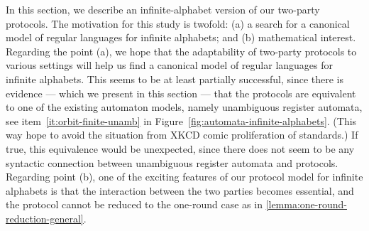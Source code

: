 In this section, we describe an infinite-alphabet version of our two-party protocols.
The motivation for this study is twofold: (a) a search for a canonical model of regular languages for infinite alphabets; and (b) mathematical interest. Regarding the point (a), we hope that the adaptability of two-party protocols to various settings will help us  find a canonical model of regular languages for infinite alphabets. This seems to be at least partially successful, since there is evidence --- which we present in this section --- that the protocols are equivalent to one of the existing automaton models, namely unambiguous register automata, see item~\ref{it:orbit-finite-unamb} in Figure~\ref{fig:automata-infinite-alphabets}. (This way hope to avoid the situation from XKCD comic proliferation of standards.) If true, this equivalence would be unexpected, since there does not seem to be any syntactic connection between unambiguous register automata and protocols. Regarding point (b), one of the exciting features of our protocol model for infinite alphabets is that the interaction between the two parties becomes essential, and the protocol cannot be reduced to the one-round case as in \cref{lemma:one-round-reduction-general}.

